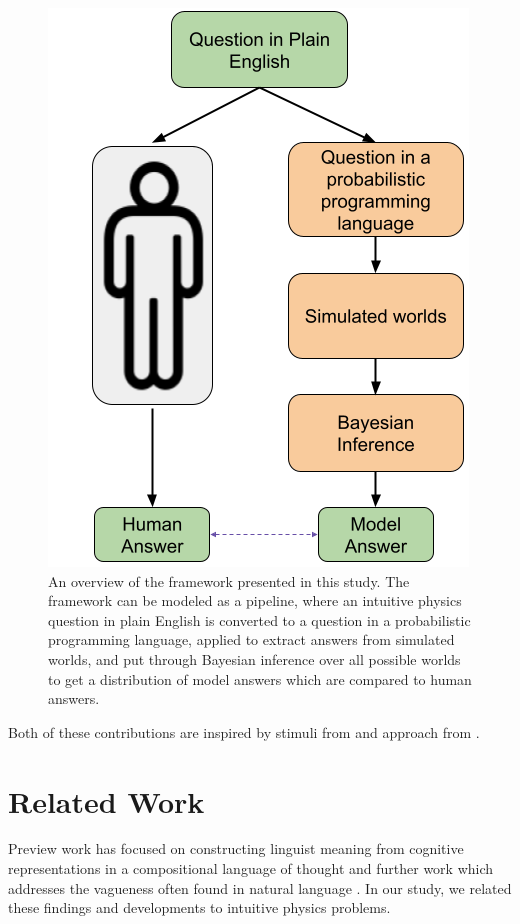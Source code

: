 \documentclass[10pt,letterpaper]{article}
\begin{document}
\begin{figure}[ht]
  \begin{center}
    \includegraphics[scale=.36]{images/966_diagram2.png}
  \end{center}
  \caption{An overview of the framework presented in this study. The framework can be modeled as a pipeline, where an intuitive physics question in plain English is converted to a question in a probabilistic programming language, applied to extract answers from simulated worlds, and put through Bayesian inference over all possible worlds to get a distribution of model answers which are compared to human answers. }
  \label{fig:workflow}
\end{figure}

Both of these contributions are inspired by stimuli from  and approach from \cite{zhang2023grounded}.

\section{Related Work}

Preview work has focused on constructing linguist meaning from cognitive representations in a compositional language of thought \cite{fodor1975language,jackendoff1985semantics} and further work which addresses the vagueness often found in natural language \cite{van2012probabilistic,cooper2015probabilistic,goodman2015probabilistic}. In our study, we related these findings and developments to intuitive physics problems.
\end{document}
